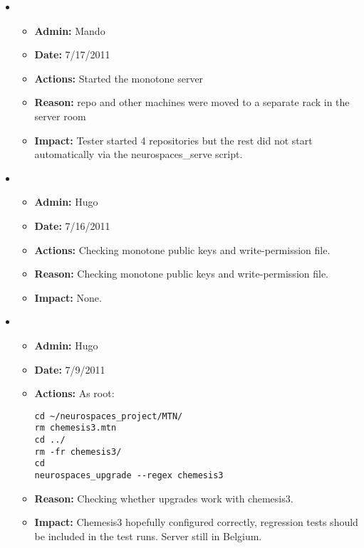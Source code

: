 \documentclass[12pt]{article}
\begin{document}
\begin{itemize}
  
\item
  \begin{itemize}
  \item[] {\bf Admin:} Mando
  \item[] {\bf Date:} 7/17/2011
  \item[] {\bf Actions:} Started the monotone server 
  \item[] {\bf Reason:} repo and other machines were moved to a separate rack in the server room
  \item[] {\bf Impact:} Tester started 4 repositories but the rest did not start automatically via the neurospaces\_serve script.
  \end{itemize}
  
  
\item
  \begin{itemize}
  \item[] {\bf Admin:} Hugo
  \item[] {\bf Date:} 7/16/2011
  \item[] {\bf Actions:} Checking monotone public keys and write-permission file.
  \item[] {\bf Reason:} Checking monotone public keys and write-permission file.
  \item[] {\bf Impact:} None.
  \end{itemize}


\item
  \begin{itemize}
  \item[] {\bf Admin:} Hugo
  \item[] {\bf Date:} 7/9/2011
  \item[] {\bf Actions:} As root:
\begin{verbatim}
cd ~/neurospaces_project/MTN/
rm chemesis3.mtn
cd ../
rm -fr chemesis3/
cd
neurospaces_upgrade --regex chemesis3
\end{verbatim}
  \item[] {\bf Reason:} Checking whether upgrades work with
    chemesis3.
  \item[] {\bf Impact:} Chemesis3 hopefully configured correctly,
    regression tests should be included in the test runs.  Server
    still in Belgium.
  \end{itemize}



\end{itemize}
\end{document}
